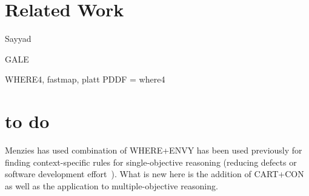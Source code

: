 \documentclass[runningheads]{llncs}
\begin{document}
\section{Related Work}

Sayyad

GALE

WHERE4, fastmap, platt
PDDF = where4

\section{to do}

Menzies has used combination of WHERE+ENVY has been
used previously for finding context-specific rules
for single-objective reasoning (reducing defects or
software development effort~\cite{me12d}).  What is
new here is the addition of CART+CON as well as the
application to multiple-objective reasoning.

{\scriptsize



}
\end{document}
